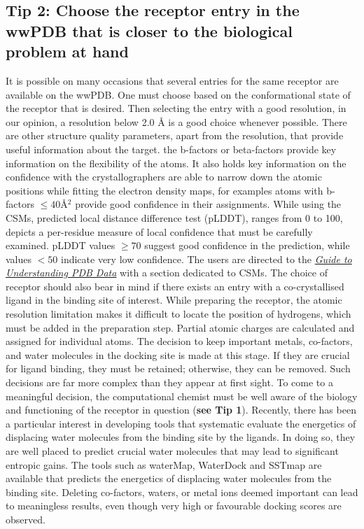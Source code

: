 \documentclass[10pt,letterpaper]{article}
\begin{document}
{{\subsection*{Tip 2: Choose the receptor entry in the wwPDB that is closer to the biological problem at hand}
It is possible on many occasions that several entries for the same receptor are available on the wwPDB. One must choose based on the conformational state of the receptor that is desired. Then selecting the entry with a good resolution, in our opinion, a resolution below 2.0 \r{A} is a good choice whenever possible. There are other structure quality parameters, apart from the resolution, that provide useful information about the target. the b-factors or beta-factors provide key information on the flexibility of the atoms. It also holds key information on the confidence with the crystallographers are able to narrow down the atomic positions while fitting the electron density maps, for examples atoms with b-factors $\le40 $\r{A}$^2$$ $ provide good confidence in their assignments. While using the CSMs, predicted local distance difference test (pLDDT), ranges from 0 to 100, depicts a per-residue measure of local confidence that must be carefully examined. pLDDT values $\ge70$ suggest good confidence in the prediction, while values $<50$ indicate very low confidence. The users are directed to the \href{https://pdb101.rcsb.org/learn/guide-to-understanding-pdb-data/computed-structure-models}{\textit{Guide to Understanding PDB Data}} with a section dedicated to CSMs.  The choice of receptor should also bear in mind if there exists an entry with a co-crystallised ligand in the binding site of interest.  While preparing the receptor, the atomic resolution limitation makes it difficult to locate the position of hydrogens, which must be added in the preparation step. Partial atomic charges are calculated and assigned for individual atoms.  The decision to keep important metals, co-factors, and water molecules in the docking site is made at this stage. If they are crucial for ligand binding, they must be retained; otherwise, they can be removed. Such decisions are far more complex than they appear at first sight. To come to a meaningful decision, the computational chemist must be well aware of the biology and functioning of the receptor in question (\textbf{see  Tip 1}). Recently, there has been a particular interest in developing tools that systematic evaluate the energetics of displacing water molecules from the binding site by the ligands. In doing so, they are well placed to predict crucial water molecules that may lead to significant entropic gains. The tools such as  waterMap\cite{bib48, bib49}, WaterDock\cite{bib47} and SSTmap\cite{bib50} are available that predicts the energetics of displacing water molecules from the binding site. Deleting co-factors, waters, or metal ions deemed important can lead to meaningless results, even though very high or favourable docking scores are observed.

}}
\end{document}
